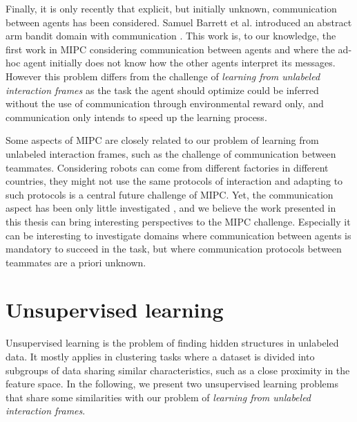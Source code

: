 Finally, it is only recently that explicit, but initially unknown, communication between agents has been considered. Samuel Barrett et al. introduced an abstract arm bandit domain with communication \cite{barrett2013communicating}. This work is, to our knowledge, the first work in MIPC considering communication between agents and where the ad-hoc agent initially does not know how the other agents interpret its messages. However this problem differs from the challenge of \emph{learning from unlabeled interaction frames} as the task the agent should optimize could be inferred without the use of communication through environmental reward only, and communication only intends to speed up the learning process.

\transition

Some aspects of MIPC are closely related to our problem of learning from unlabeled interaction frames, such as the challenge of communication between teammates. Considering robots can come from different factories in different countries, they might not use the same protocols of interaction and adapting to such protocols is a central future challenge of MIPC. Yet, the communication aspect has been only little investigated \cite{barrett2013communicating}, and we believe the work presented in this thesis can bring interesting perspectives to the MIPC challenge. Especially it can be interesting to investigate domains where communication between agents is mandatory to succeed in the task, but where communication protocols between teammates are a priori unknown.

\section{Unsupervised learning}

Unsupervised learning is the problem of finding hidden structures in unlabeled data. It mostly applies in clustering tasks where a dataset is divided into subgroups of data sharing similar characteristics, such as a close proximity in the feature space. In the following, we present two unsupervised learning problems that share some similarities with our problem of \emph{learning from unlabeled interaction frames}.


